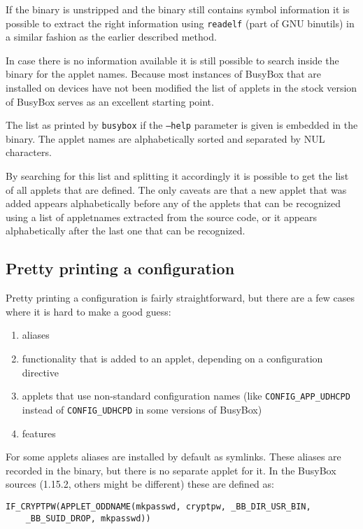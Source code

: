 \documentclass[10pt]{article}
\begin{document}
If the binary is unstripped and the binary still contains symbol information
it is possible to extract the right information using \texttt{readelf} (part
of GNU binutils) in a similar fashion as the earlier described method.

In case there is no information available it is still possible to search inside
the binary for the applet names. Because most instances of BusyBox that are
installed on devices have not been modified the list of applets in the stock
version of BusyBox serves as an excellent starting point.

The list as printed by \texttt{busybox} if the \texttt{--help} parameter is
given is embedded in the binary. The applet names are alphabetically sorted
and separated by NUL characters.

By searching for this list and splitting it accordingly it is possible to get
the list of all applets that are defined. The only caveats are that a new
applet that was added appears alphabetically before any of the applets that
can be recognized using a list of appletnames extracted from the source code,
or it appears alphabetically after the last one that can be recognized.

\subsection{Pretty printing a configuration}

Pretty printing a configuration is fairly straightforward, but there are a few
cases where it is hard to make a good guess:

\begin{enumerate}
\item aliases
\item functionality that is added to an applet, depending on a configuration directive
\item applets that use non-standard configuration names (like \texttt{CONFIG\_APP\_UDHCPD} instead of \texttt{CONFIG\_UDHCPD} in some versions of BusyBox)
\item features
\end{enumerate}

For some applets aliases are installed by default as symlinks. These aliases
are recorded in the binary, but there is no separate applet for it. In the
BusyBox sources (1.15.2, others might be different) these are defined as:

\begin{verbatim}
IF_CRYPTPW(APPLET_ODDNAME(mkpasswd, cryptpw, _BB_DIR_USR_BIN,
    _BB_SUID_DROP, mkpasswd))
\end{verbatim}
\end{document}
